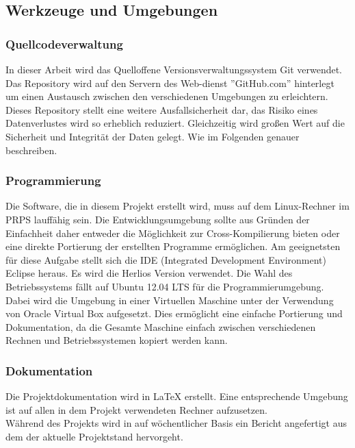\documentclass[a4paper,12pt,fleqn]{article}
\begin{document}
\subsection{Werkzeuge und Umgebungen}
\subsubsection{Quellcodeverwaltung}
In dieser Arbeit wird das Quelloffene Versionsverwaltungssystem Git verwendet.
Das Repository wird auf den Servern des Web-dienst ''GitHub.com'' hinterlegt um
einen Austausch zwischen den verschiedenen Umgebungen zu erleichtern. Dieses
Repository stellt eine weitere Ausfallsicherheit dar, das Risiko eines
Datenverlustes wird so erheblich reduziert. Gleichzeitig wird großen Wert auf
die Sicherheit und Integrität der Daten gelegt. Wie im Folgenden
genauer beschreiben.

\subsubsection{Programmierung}
Die Software, die in diesem Projekt erstellt wird, muss auf dem Linux-Rechner im PRPS lauffähig sein. Die Entwicklungsumgebung sollte aus Gründen der Einfachheit daher entweder die Möglichkeit zur Cross-Kompilierung bieten oder eine direkte Portierung der erstellten Programme ermöglichen. Am geeignetsten für diese Aufgabe stellt sich die IDE (Integrated Development Environment) Eclipse heraus. Es wird die Herlios Version verwendet. Die Wahl des Betriebssystems fällt auf Ubuntu 12.04 LTS für die Programmierumgebung. Dabei wird die Umgebung in einer Virtuellen Maschine unter der Verwendung von Oracle Virtual Box aufgesetzt. Dies ermöglicht eine einfache Portierung und Dokumentation, da die Gesamte Maschine einfach zwischen verschiedenen Rechnen und Betriebssystemen kopiert werden kann.

\subsubsection{Dokumentation}
Die Projektdokumentation wird in \LaTeX{} erstellt. Eine entsprechende Umgebung ist auf allen in dem Projekt verwendeten Rechner aufzusetzen.\\
Während des Projekts wird in auf wöchentlicher Basis ein Bericht angefertigt aus dem der aktuelle Projektstand hervorgeht.
\end{document}
